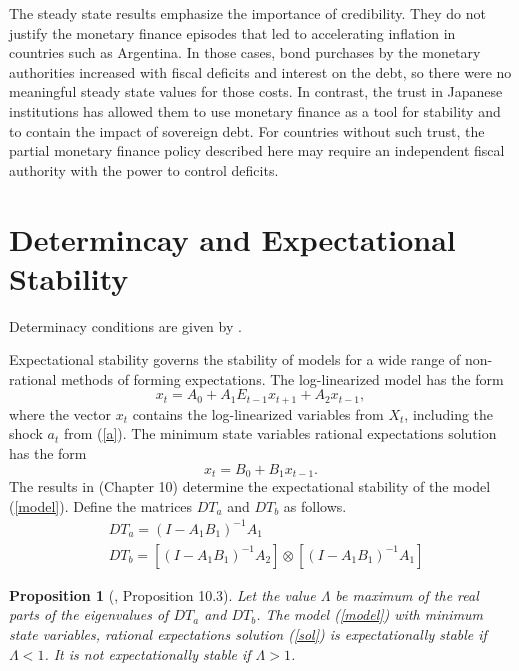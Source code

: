 \documentclass[]{article}
\newtheorem{proposition}[theorem]{Proposition}
\begin{document}
The steady state results emphasize the importance of credibility. They do not justify the monetary finance episodes that led to accelerating inflation in countries such as Argentina. In those cases, bond purchases by the monetary authorities increased with fiscal deficits and interest on the debt, so there were no meaningful steady state values for those costs. In contrast, the trust in Japanese institutions has allowed them to use monetary finance as a tool for stability and to contain the impact of sovereign debt. For countries without such trust, the partial monetary finance policy described here may require an independent fiscal authority with the power to control deficits.

\printbibliography

\clearpage
\appendix
\section{Determincay and Expectational Stability} \label{app: exp stability}

Determinacy conditions are given by \textcite{blanchard1980solution}.

 Expectational stability governs the stability of models for a wide range of non-rational methods of forming expectations. The log-linearized model has the form
\begin{equation}
    x_{t} = A_{0} + A_{1}E_{t-1}x_{t+1} + A_{2}x_{t-1},
    \label{model}
\end{equation}
where the vector $x_{t}$ contains the log-linearized variables from $X_{t}$, including the shock $a_{t}$ from (\ref{a}).
The minimum state variables rational expectations solution has the form
\begin{equation}
    x_{t}=B_{0}+B_{1}x_{t-1}.
    \label{sol}
\end{equation}
The results in \textcite{evans2001learning} (Chapter 10) determine the expectational stability of the model (\ref{model}). Define the matrices $DT_{a}$ and $DT_{b}$ as follows.
\begin{eqnarray}
     & DT_{a}=(I-A_{1}B_{1})^{-1}A_{1} \\
     & DT_{b}=[(I-A_{1}B_{1})^{-1}A_{2}]\otimes[(I-A_{1}B_{1})^{-1}A_{1}]
\end{eqnarray}

\begin{proposition}
  [\textcite{evans2001learning}, Proposition 10.3] Let the value $\Lambda$ be maximum of the real parts of the eigenvalues of $DT_{a}$ and $DT_{b}$. The model (\ref{model}) with minimum state variables, rational expectations solution (\ref{sol}) is expectationally stable if $\Lambda<1$. It is not expectationally stable  if $\Lambda>1$.  
\end{proposition}
\end{document}

